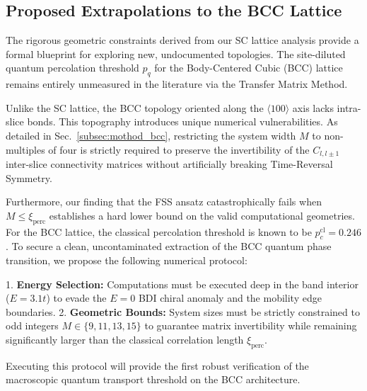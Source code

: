 \subsection{Proposed Extrapolations to the BCC Lattice}
\label{subsec:results_bcc}

The rigorous geometric constraints derived from our SC lattice analysis provide a formal blueprint for exploring new, undocumented topologies. The site-diluted quantum percolation threshold $p_q$ for the Body-Centered Cubic (BCC) lattice remains entirely unmeasured in the literature via the Transfer Matrix Method.

Unlike the SC lattice, the BCC topology oriented along the $\langle 100 \rangle$ axis lacks intra-slice bonds. This topography introduces unique numerical vulnerabilities. As detailed in Sec.~\ref{subsec:mothod_bcc}, restricting the system width $M$ to non-multiples of four is strictly required to preserve the invertibility of the $C_{l, l\pm1}$ inter-slice connectivity matrices without artificially breaking Time-Reversal Symmetry.

Furthermore, our finding that the FSS ansatz catastrophically fails when $M \le \xi_{\text{perc}}$ establishes a hard lower bound on the valid computational geometries. For the BCC lattice, the classical percolation threshold is known to be $p_c^{\text{cl}} = 0.246$. To secure a clean, uncontaminated extraction of the BCC quantum phase transition, we propose the following numerical protocol:

1. \textbf{Energy Selection:} Computations must be executed deep in the band interior ($E=3.1t$) to evade the $E=0$ BDI chiral anomaly and the mobility edge boundaries.
2. \textbf{Geometric Bounds:} System sizes must be strictly constrained to odd integers $M \in \{9, 11, 13, 15\}$ to guarantee matrix invertibility while remaining significantly larger than the classical correlation length $\xi_{\text{perc}}$. 

Executing this protocol will provide the first robust verification of the macroscopic quantum transport threshold on the BCC architecture.
